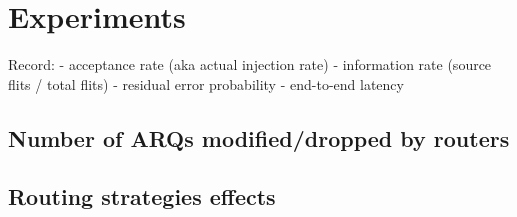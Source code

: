 \section{Experiments}
Record:
- acceptance rate (aka actual injection rate)
- information rate (source flits / total flits)
- residual error probability
- end-to-end latency
\subsection{Number of ARQs modified/dropped by routers}
\subsection{Routing strategies effects}

\iffalse
Experiment setup parameter tables:
- NC mode (UC, G2C3, G2C4)
- ...

ARQ Limit: 1, at most 2 because more ARQs allowed per transmission unit means larger retransmission buffers everywhere

\section{Statistics}
\begin{itemize}
    \item Injection/acceptance rate: [0, 1] (at processing element and at network interface)
    \item Queue lengths and buffer sizes
    \item Workload of crypto units
    \item Average/max flit waiting time at entry guard
    \item Average/max hop count
\end{itemize}

\section{Area Overhead}
\fi
